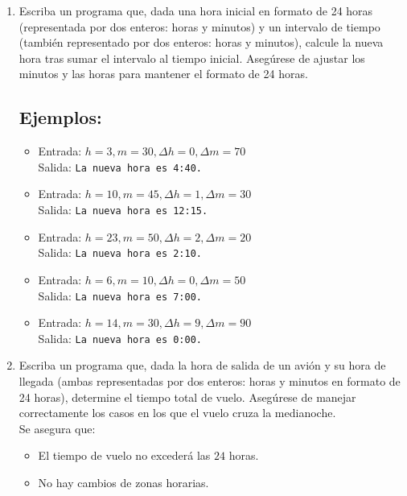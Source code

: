 \begin{enumerate}[label=\alph*)]
    \item Escriba un programa que, dada una hora inicial en formato de 24 horas (representada por dos enteros: horas y minutos) y un intervalo de tiempo (también representado por dos enteros: horas y minutos), calcule la nueva hora tras sumar el intervalo al tiempo inicial. Asegúrese de ajustar los minutos y las horas para mantener el formato de 24 horas.
    \subsection*{Ejemplos:}
    \begin{itemize}
        \item Entrada: \(h = 3, m = 30, \Delta h = 0, \Delta m = 70\)\\
              Salida: \texttt{La nueva hora es 4:40.}
        \item Entrada: \(h = 10, m = 45, \Delta h = 1, \Delta m = 30\)\\
              Salida: \texttt{La nueva hora es 12:15.}
        \item Entrada: \(h = 23, m = 50, \Delta h = 2, \Delta m = 20\)\\
              Salida: \texttt{La nueva hora es 2:10.}
        \item Entrada: \(h = 6, m = 10, \Delta h = 0, \Delta m = 50\)\\
              Salida: \texttt{La nueva hora es 7:00.}
        \item Entrada: \(h = 14, m = 30, \Delta h = 9, \Delta m = 90\)\\
              Salida: \texttt{La nueva hora es 0:00.}
    \end{itemize}

    \item Escriba un programa que, dada la hora de salida de un avión y su hora de llegada (ambas representadas por dos enteros: horas y minutos en formato de 24 horas), determine el tiempo total de vuelo. Asegúrese de manejar correctamente los casos en los que el vuelo cruza la medianoche.\\
    Se asegura que:
    \begin{itemize}
        \item El tiempo de vuelo no excederá las \(24\) horas.
        \item No hay cambios de zonas horarias.
    \end{itemize}

\end{enumerate}
